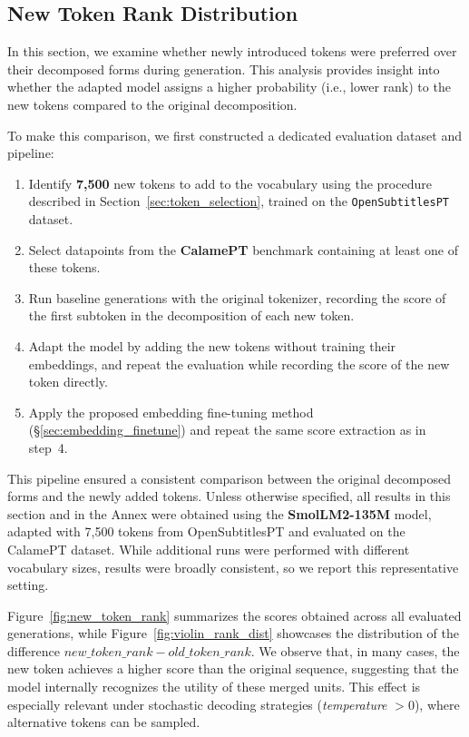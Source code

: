 \subsection{New Token Rank Distribution}
\label{subsec:rank-distributions}

In this section, we examine whether newly introduced tokens were preferred over their decomposed forms during generation. This analysis provides insight into whether the adapted model assigns a higher probability (i.e., lower rank) to the new tokens compared to the original decomposition.

To make this comparison, we first constructed a dedicated evaluation dataset and pipeline:

\begin{enumerate}
    \item Identify \textbf{7,500} new tokens to add to the vocabulary using the procedure described in Section~\ref{sec:token_selection}, trained on the \texttt{OpenSubtitlesPT} dataset.
    \item Select datapoints from the \textbf{CalamePT} benchmark containing at least one of these tokens.
    \item Run baseline generations with the original tokenizer, recording the score of the first subtoken in the decomposition of each new token.
    \item Adapt the model by adding the new tokens without training their embeddings, and repeat the evaluation while recording the score of the new token directly.
    \item Apply the proposed embedding fine-tuning method (\S\ref{sec:embedding_finetune}) and repeat the same score extraction as in step~4.
\end{enumerate}

This pipeline ensured a consistent comparison between the original decomposed forms and the newly added tokens. Unless otherwise specified, all results in this section and in the Annex were obtained using the \textbf{SmolLM2-135M} model, adapted with 7,500 tokens from OpenSubtitlesPT and evaluated on the CalamePT dataset. While additional runs were performed with different vocabulary sizes, results were broadly consistent, so we report this representative setting.

Figure~\ref{fig:new_token_rank} summarizes the scores obtained across all evaluated generations, while Figure~\ref{fig:violin_rank_dist} showcases the distribution of the difference $new\_token\_rank - old\_token\_rank$. We observe that, in many cases, the new token achieves a higher score than the original sequence, suggesting that the model internally recognizes the utility of these merged units. This effect is especially relevant under stochastic decoding strategies (\textit{temperature} $>0$), where alternative tokens can be sampled.  

